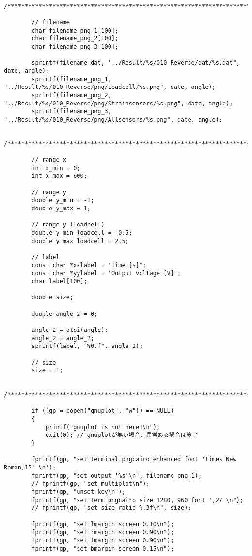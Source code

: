 \documentclass[12pt,a4paper]{jsarticle}
\begin{document}
{\begin{lstlisting}
        /*****************************************************************************/
    
        // filename
        char filename_png_1[100];
        char filename_png_2[100];
        char filename_png_3[100];
    
        sprintf(filename_dat, "../Result/%s/010_Reverse/dat/%s.dat", date, angle);
        sprintf(filename_png_1, "../Result/%s/010_Reverse/png/Loadcell/%s.png", date, angle);
        sprintf(filename_png_2, "../Result/%s/010_Reverse/png/Strainsensors/%s.png", date, angle);
        sprintf(filename_png_3, "../Result/%s/010_Reverse/png/Allsensors/%s.png", date, angle);
    
        /*****************************************************************************/
    
        // range x
        int x_min = 0;
        int x_max = 600;
    
        // range y
        double y_min = -1;
        double y_max = 1;
    
        // range y (loadcell)
        double y_min_loadcell = -0.5;
        double y_max_loadcell = 2.5;
    
        // label
        const char *xxlabel = "Time [s]";
        const char *yylabel = "Output voltage [V]";
        char label[100];
    
        double size;
    
        double angle_2 = 0;
    
        angle_2 = atoi(angle);
        angle_2 = angle_2;
        sprintf(label, "%0.f", angle_2);
    
        // size
        size = 1;
    
        /*****************************************************************************/
    
        if ((gp = popen("gnuplot", "w")) == NULL)
        {
            printf("gnuplot is not here!\n");
            exit(0); // gnuplotが無い場合、異常ある場合は終了
        }
    
        fprintf(gp, "set terminal pngcairo enhanced font 'Times New Roman,15' \n");
        fprintf(gp, "set output '%s'\n", filename_png_1);
        // fprintf(gp, "set multiplot\n");
        fprintf(gp, "unset key\n");
        fprintf(gp, "set term pngcairo size 1280, 960 font ',27'\n");
        // fprintf(gp, "set size ratio %.3f\n", size);
    
        fprintf(gp, "set lmargin screen 0.10\n");
        fprintf(gp, "set rmargin screen 0.90\n");
        fprintf(gp, "set tmargin screen 0.90\n");
        fprintf(gp, "set bmargin screen 0.15\n");
    

\end{lstlisting}}
\end{document}
